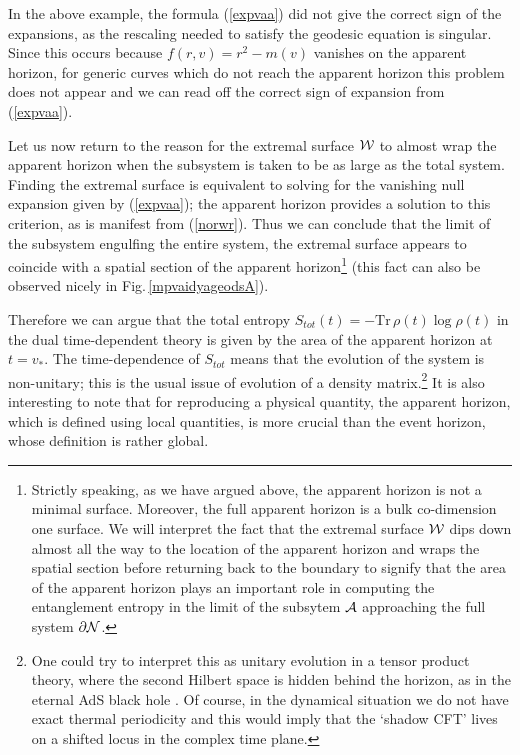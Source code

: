 \documentclass[12pt]{article}
\def\fig#1{Fig.\,\ref{#1}}
\def\req#1{(\ref{#1})}
\def\p{\partial}
\def\CA{{\cal A}}
\def\CW{{\cal W}}
\def\p{\partial}
\def\p{\partial}
\def\bdys{\p{\cal N}}
\def\Gms{\CW}
\def\rA{\CA}
\begin{document}
In the above example, the formula \req{expvaa} did not give the
correct sign of the expansions, as the rescaling needed to satisfy
the geodesic equation is singular. Since this occurs because
$f(r,v)=r^2-m(v)$ vanishes on the apparent horizon, for generic
curves which do not reach the apparent horizon this problem does not
appear and we can read off the correct sign of expansion from
\req{expvaa}.

Let us now return  to the reason for the extremal surface $\Gms$ to almost wrap the apparent horizon when the subsystem is taken to be as large as the total system. Finding the  extremal surface is equivalent to solving for the vanishing null expansion given by \req{expvaa};  the apparent horizon provides  a solution to this criterion, as is
manifest from \req{norwr}. Thus we can conclude that the limit of the subsystem engulfing the entire system,  the extremal surface appears to coincide with a
spatial section of the apparent horizon\footnote{Strictly speaking, as we have argued above, the apparent horizon is not a minimal surface. Moreover, the full apparent horizon is  a bulk co-dimension one surface. We will interpret the fact that the extremal surface $\Gms$ dips down almost all the way to the location of the apparent horizon and wraps the spatial section before returning back to the boundary to signify that the area of the apparent horizon plays an important role in computing the entanglement entropy in the limit of the subsytem $\rA$ approaching the full system $\bdys$.} (this fact can also be observed nicely in \fig{mpvaidyageodsA}).


Therefore we can argue that the total entropy $S_{tot}(t)=-\mbox{Tr}
\, \rho(t)\log\rho(t)$ in the dual time-dependent theory is given by
the area of the apparent horizon at $t=v_*$. The time-dependence of
$S_{tot}$ means that the evolution of the system is non-unitary;
this is the usual issue of evolution of a density matrix.\footnote{ One could
try to interpret this as unitary evolution in a tensor product
theory, where the second Hilbert space is hidden behind the horizon,
as in the eternal AdS black hole \cite{Maldacena:2001kr}. Of course,
in the dynamical situation we do not have exact thermal periodicity
and this would imply that the `shadow CFT' lives on a shifted locus
in the complex time plane.} It is
also interesting to note that for reproducing a physical quantity,
the apparent horizon, which is defined using local quantities, is
more crucial than the event horizon, whose definition is rather
global.
\end{document}
